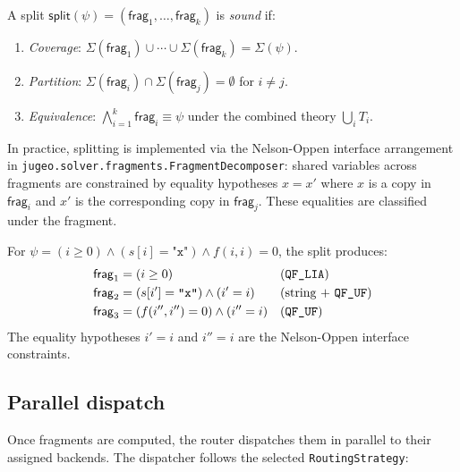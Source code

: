 \documentclass[11pt]{article}
\newcommand{\VC}{\psi}                    %
\newcommand{\Frag}[1]{\mathsf{frag}_{#1}} %
\newcommand{\Split}{\mathsf{split}}       %
\begin{document}
\begin{definition}\label{def:sound-split}
A split $\Split(\VC) = (\Frag{1},\ldots,\Frag{k})$ is \emph{sound} if:
\begin{enumerate}[label=(\roman*)]
  \item \emph{Coverage}: $\Sigma(\Frag{1}) \cup \cdots \cup \Sigma(\Frag{k}) = \Sigma(\VC)$.
  \item \emph{Partition}: $\Sigma(\Frag{i}) \cap \Sigma(\Frag{j}) = \emptyset$
    for $i \neq j$.
  \item \emph{Equivalence}: $\bigwedge_{i=1}^k \Frag{i} \equiv \VC$
    under the combined theory $\bigcup_i T_i$.
\end{enumerate}
\end{definition}

In practice, splitting is implemented via the Nelson-Oppen interface
arrangement in \texttt{jugeo.solver.fragments.FragmentDecomposer}: shared
variables across fragments are constrained by equality hypotheses
$x = x'$ where $x$ is a copy in $\Frag{i}$ and $x'$ is the
corresponding copy in $\Frag{j}$.  These equalities are classified
under the \QFUF{} fragment.

\begin{example}\label{ex:split}
For $\VC = (i \geq 0) \wedge (s[i] = \texttt{"x"}) \wedge f(i,i) = 0$,
the split produces:
\begin{align*}
\Frag{1} &= (i \geq 0) &&\text{(\QFLIA)}\\
\Frag{2} &= (s[i'] = \texttt{"x"}) \wedge (i' = i) &&\text{(string + \QFUF)}\\
\Frag{3} &= (f(i'',i'') = 0) \wedge (i'' = i) &&\text{(\QFUF)}
\end{align*}
The equality hypotheses $i' = i$ and $i'' = i$ are the Nelson-Oppen
interface constraints.
\end{example}

\subsection{Parallel dispatch}\label{sec:dispatch}

Once fragments are computed, the router dispatches them in parallel to
their assigned backends.  The dispatcher follows the selected
\texttt{RoutingStrategy}:
\end{document}
